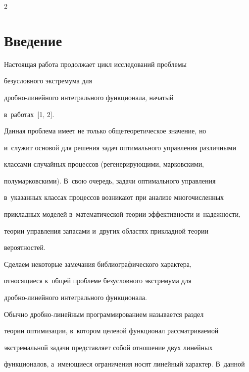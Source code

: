 \begin{multicols}{2}



\label{st\stat}

      

      

\section{Введение}



     Настоящая работа продолжает цикл исследований проб\-ле\-мы 

безусловного экстремума для 

     дроб\-но-ли\-ней\-но\-го интегрального функционала, начатый 

в~работах~[1, 2].

     

     Данная проблема имеет не только общетеорети\-ческое значение, но 

и~служит основой для реше\-ния задач оптимального управ\-ле\-ния различными\linebreak 

классами случайных процессов (регенерирующими, марковскими, 

полумарковскими). В~свою очередь, задачи оптимального управ\-ле\-ния 

в~указанных классах процессов возникают при анализе многочисленных 

при\-клад\-ных моделей в~математической теории эффективности и~на\-деж\-ности, 

тео\-рии управ\-ле\-ния запасами и~других об\-ластях прикладной тео\-рии 

вероятностей.

     

     Сделаем некоторые замечания биб\-лио\-гра\-фи\-че\-ско\-го характера, 

относящиеся к~общей проб\-ле\-ме безусловного экстремума для 

дроб\-но-ли\-ней\-но\-го интегрального функционала.

     

     Обычно дробно-ли\-ней\-ным программированием называется раздел 

тео\-рии оптимизации, в~котором целевой функционал рас\-смат\-ри\-ва\-емой 

экстремальной задачи пред\-став\-ля\-ет собой отношение двух линейных 

функционалов, а~име\-ющи\-еся ограничения носят линейный характер. В~данной 


\end{multicols}
